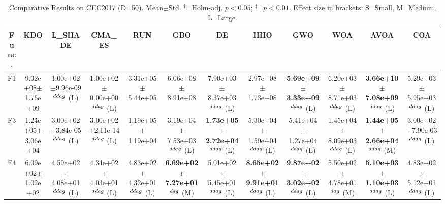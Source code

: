 \begin{table}[!t]
\centering\small
\caption{Comparative Results on CEC2017 (D=50). Mean$\pm$Std. $^{\dag}$=Holm-adj. $p<0.05$; $^{\ddag}$=$p<0.01$. Effect size in brackets: S=Small, M=Medium, L=Large.}
\label{tab:enhanced}
\begin{tabular}{c|ccccccccccc}
\hline
Func. & \textbf{KDO} & L_SHADE & CMA_ES & RUN & GBO & DE & HHO & GWO & WOA & AVOA & COA \\ \hline\hline
F1  & 9.32e+08$\pm$1.76e+09  & 1.00e+02$\pm$9.96e-09$^{\\ddag}$ (L)  & 1.00e+02$\pm$0.00e+00$^{\\ddag}$ (L)  & 3.31e+05$\pm$5.44e+05   & 6.06e+08$\pm$8.91e+08   & 7.90e+03$\pm$8.37e+03$^{\\ddag}$ (L)  & 2.97e+08$\pm$1.73e+08   & \textbf{5.69e+09$\pm$3.33e+09}$^{\\ddag}$ (L)  & 6.20e+03$\pm$8.71e+03$^{\\ddag}$ (L)  & \textbf{3.66e+10$\pm$7.08e+09}$^{\\ddag}$ (L)  & 5.29e+03$\pm$5.95e+03$^{\\ddag}$ (L) \\ \hline
F3  & 1.24e+05$\pm$3.06e+04  & 3.00e+02$\pm$3.84e-05$^{\\ddag}$ (L)  & 3.00e+02$\pm$2.11e-14$^{\\ddag}$ (L)  & 1.19e+05$\pm$1.19e+04   & 3.19e+04$\pm$7.53e+03$^{\\ddag}$ (L)  & \textbf{1.73e+05$\pm$2.72e+04}$^{\\ddag}$ (L)  & 5.30e+04$\pm$1.50e+04$^{\\ddag}$ (L)  & 5.41e+04$\pm$1.27e+04$^{\\ddag}$ (L)  & 1.45e+04$\pm$8.09e+03$^{\\ddag}$ (L)  & \textbf{1.44e+05$\pm$2.66e+04}$^{\\ddag}$ (M)  & 3.00e+02$\pm$7.90e-03$^{\\ddag}$ (L) \\ \hline
F4  & 6.09e+02$\pm$1.02e+02  & 4.59e+02$\pm$4.08e+01$^{\\ddag}$ (L)  & 4.34e+02$\pm$4.03e+01$^{\\ddag}$ (L)  & 4.83e+02$\pm$4.32e+01$^{\\ddag}$ (L)  & \textbf{6.69e+02$\pm$7.27e+01}$^{\\dag}$ (M)  & 5.01e+02$\pm$5.45e+01$^{\\ddag}$ (L)  & \textbf{8.65e+02$\pm$9.91e+01}$^{\\ddag}$ (L)  & \textbf{9.87e+02$\pm$3.02e+02}$^{\\ddag}$ (L)  & 5.50e+02$\pm$4.78e+01$^{\\dag}$ (M)  & \textbf{5.10e+03$\pm$1.10e+03}$^{\\ddag}$ (L)  & 4.83e+02$\pm$5.12e+01$^{\\ddag}$ (L) \\ \hline

\end{tabular}
\end{table}
